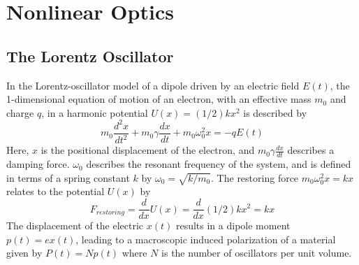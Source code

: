\chapter{Nonlinear Optics}\label{sec:background:NonlinearOptics}

\section{The Lorentz Oscillator}
In the Lorentz-oscillator model of a dipole driven by an electric field $E(t)$, the 1-dimensional equation of motion of an electron, with an effective mass $m_0$ and charge $q$, in a harmonic potential $U(x) = (1/2)kx^{2}$ is described by
\begin{equation}\label{eq:NonlinearOptics:eqMotion}
	m_{0} \frac{d^2 x}{dt^2} + m_{0} \gamma \frac{dx}{dt} + m_{0} \omega_{0}^2 x = -q E(t)
\end{equation}
Here, $x$ is the positional displacement of the electron, and $m_{0} \gamma \frac{dx}{dt}$ describes a damping force. $\omega_{0}$ describes the resonant frequency of the system, and is defined in terms of a spring constant $k$ by $\omega_{0} = \sqrt{k/m_{0}}$. The restoring force $m_{0} \omega_{0}^2 x = kx$ relates to the potential $U(x)$ by
\begin{equation}
	F_{restoring} = \frac{d}{dx} U(x) = \frac{d}{dx} (1/2)kx^{2} = kx
\end{equation}
The displacement of the electric $x(t)$ results in a dipole moment $p(t) = ex(t)$, leading to a macroscopic induced polarization of a material given by $P(t) = Np(t)$ where $N$ is the number of oscillators per unit volume.

